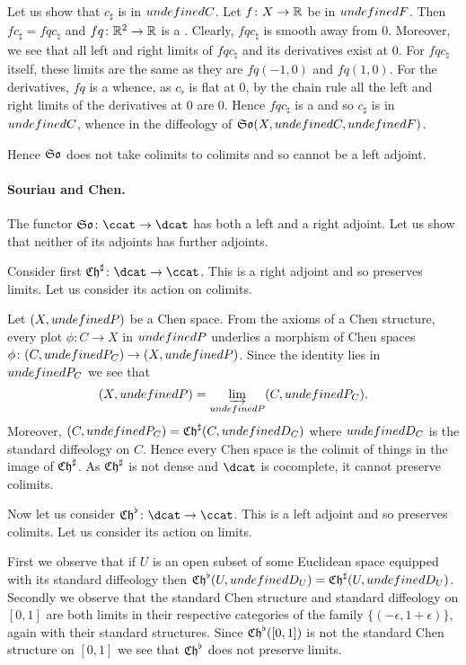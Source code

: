 \documentclass[%
a4paper,%
arxiv,%
defaults
]{myclass}
\begin{document}
Let us show that \(c_\sharp\) is in \(\m{C}\).
Let \(f \colon X \to \mathbb{R}\) be in \(\m{F}\).
Then
 \(f c_\sharp = f q c_\natural\)
and
 \(f q \colon \mathbb{R}^2 \to \mathbb{R}\)
is a \cimap.
Clearly, \(f q c_\natural\) is smooth away from \(0\).
Moreover, we see that all left and right limits of \(f q c_\natural\) and its derivatives exist at \(0\).
For \(f q c_\natural\) itself, these limits are the same as they are \(f q(-1, 0)\) and \(f q(1, 0)\).
For the derivatives, \(f q\) is a \cimap whence, as \(c_\flat\) is flat at \(0\), by the chain rule all the left and right limits of the derivatives at \(0\) are \(0\).
Hence \(f q c_\natural\) is a \cimap and so \(c_\sharp\) is in \(\m{C}\), whence in the diffeology of \(\FrSo(X, \m{C}, \m{F})\).

Hence \(\FrSo\) does not take colimits to colimits and so cannot be a left adjoint.

\paragraph{Souriau and Chen.}
The functor \(\ChSo \colon \ccat \to \dcat\) has both a left and a right adjoint.
Let us show that neither of its adjoints has further adjoints.

Consider first \(\SoCht \colon \dcat \to \ccat\).
This is a right adjoint and so preserves limits.
Let us consider its action on colimits.

Let \((X, \m{P})\) be a Chen space.
From the axioms of a Chen structure, every plot \(\phi \colon C \to X\) in \(\m{P}\) underlies a morphism of Chen spaces \(\phi \colon (C, \m{P}_C) \to (X, \m{P})\).
Since the identity lies in \(\m{P}_C\) we see that
%
\[
  (X, \m{P}) = \varinjlim_{\m{P}} (C, \m{P}_C).
\]
%
Moreover, \((C, \m{P}_C) = \SoCht(C, \m{D}_C)\) where \(\m{D}_C\) is the standard diffeology on \(C\).
Hence every Chen space is the colimit of things in the image of \(\SoCht\).
As \(\SoCht\) is not dense and \(\dcat\) is cocomplete, it cannot preserve colimits.

Now let us consider \(\SoChb \colon \dcat \to \ccat\).
This is a left adjoint and so preserves colimits.
Let us consider its action on limits.

First we observe that if \(U\) is an open subset of some Euclidean space equipped with its standard diffeology then \(\SoChb(U, \m{D}_U) = \SoCht(U, \m{D}_U)\).
Secondly we observe that the standard Chen structure and standard diffeology on \([0,1]\) are both limits in their respective categories of the family \(\{(-\epsilon, 1 + \epsilon)\}\), again with their standard structures.
Since \(\SoChb([0,1])\) is not the standard Chen structure on \([0,1]\) we see that \(\SoChb\) does not preserve limits.
\end{document}
